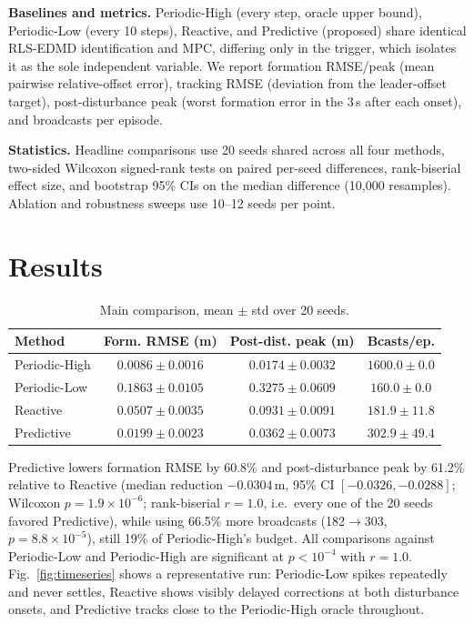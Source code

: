 \documentclass[10pt,conference]{IEEEtran}
\begin{document}
\textbf{Baselines and metrics.} Periodic-High (every step, oracle upper bound), Periodic-Low (every 10 steps), Reactive, and Predictive (proposed) share identical RLS-EDMD identification and MPC, differing only in the trigger, which isolates it as the sole independent variable. We report formation RMSE/peak (mean pairwise relative-offset error), tracking RMSE (deviation from the leader-offset target), post-disturbance peak (worst formation error in the 3\,s after each onset), and broadcasts per episode.

\textbf{Statistics.} Headline comparisons use 20 seeds shared across all four methods, two-sided Wilcoxon signed-rank tests on paired per-seed differences, rank-biserial effect size, and bootstrap 95\% CIs on the median difference (10{,}000 resamples). Ablation and robustness sweeps use 10--12 seeds per point.

\section{Results}
\label{sec:results}

\begin{table}[t]
\centering
\caption{Main comparison, mean $\pm$ std over 20 seeds.}
\label{tab:main}
\scriptsize
\setlength{\tabcolsep}{3pt}
\begin{tabular}{lccc}
\toprule
Method & Form. RMSE (m) & Post-dist. peak (m) & Bcasts/ep. \\
\midrule
Periodic-High & $0.0086\pm0.0016$ & $0.0174\pm0.0032$ & $1600.0\pm0.0$ \\
Periodic-Low  & $0.1863\pm0.0105$ & $0.3275\pm0.0609$ & $160.0\pm0.0$ \\
Reactive      & $0.0507\pm0.0035$ & $0.0931\pm0.0091$ & $181.9\pm11.8$ \\
Predictive    & $0.0199\pm0.0023$ & $0.0362\pm0.0073$ & $302.9\pm49.4$ \\
\bottomrule
\end{tabular}
\end{table}

Predictive lowers formation RMSE by 60.8\% and post-disturbance peak by 61.2\% relative to Reactive (median reduction $-0.0304$\,m, 95\% CI $[-0.0326,-0.0288]$; Wilcoxon $p=1.9\times10^{-6}$; rank-biserial $r=1.0$, i.e.\ every one of the 20 seeds favored Predictive), while using 66.5\% more broadcasts (182$\to$303, $p=8.8\times10^{-5}$), still 19\% of Periodic-High's budget. All comparisons against Periodic-Low and Periodic-High are significant at $p<10^{-4}$ with $r=1.0$. Fig.~\ref{fig:timeseries} shows a representative run: Periodic-Low spikes repeatedly and never settles, Reactive shows visibly delayed corrections at both disturbance onsets, and Predictive tracks close to the Periodic-High oracle throughout.
\end{document}
